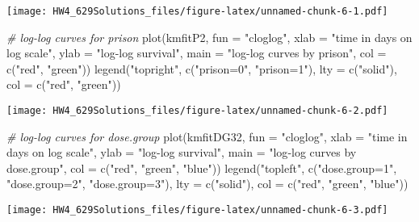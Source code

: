 \documentclass[
]{article}
\newenvironment{Shaded}{\begin{snugshade}}{\end{snugshade}}
\newcommand{\AttributeTok}[1]{\textcolor[rgb]{0.77,0.63,0.00}{#1}}
\newcommand{\CommentTok}[1]{\textcolor[rgb]{0.56,0.35,0.01}{\textit{#1}}}
\newcommand{\FunctionTok}[1]{\textcolor[rgb]{0.00,0.00,0.00}{#1}}
\newcommand{\NormalTok}[1]{#1}
\newcommand{\StringTok}[1]{\textcolor[rgb]{0.31,0.60,0.02}{#1}}
\begin{document}
\texttt{[image: HW4\_629Solutions\_files/figure-latex/unnamed-chunk-6-1.pdf]}

\begin{Shaded}
\begin{Highlighting}[]
\CommentTok{\# log{-}log curves for prison}
\FunctionTok{plot}\NormalTok{(kmfitP2, }\AttributeTok{fun =} \StringTok{"cloglog"}\NormalTok{, }\AttributeTok{xlab =} \StringTok{"time in days on log scale"}\NormalTok{, }\AttributeTok{ylab =} \StringTok{"log{-}log survival"}\NormalTok{,}
    \AttributeTok{main =} \StringTok{"log{-}log curves by prison"}\NormalTok{, }\AttributeTok{col =} \FunctionTok{c}\NormalTok{(}\StringTok{"red"}\NormalTok{, }\StringTok{"green"}\NormalTok{))}
\FunctionTok{legend}\NormalTok{(}\StringTok{"topright"}\NormalTok{, }\FunctionTok{c}\NormalTok{(}\StringTok{"prison=0"}\NormalTok{, }\StringTok{"prison=1"}\NormalTok{), }\AttributeTok{lty =} \FunctionTok{c}\NormalTok{(}\StringTok{"solid"}\NormalTok{), }\AttributeTok{col =} \FunctionTok{c}\NormalTok{(}\StringTok{"red"}\NormalTok{, }\StringTok{"green"}\NormalTok{))}
\end{Highlighting}
\end{Shaded}

\texttt{[image: HW4\_629Solutions\_files/figure-latex/unnamed-chunk-6-2.pdf]}

\begin{Shaded}
\begin{Highlighting}[]
\CommentTok{\# log{-}log curves for dose.group}
\FunctionTok{plot}\NormalTok{(kmfitDG32, }\AttributeTok{fun =} \StringTok{"cloglog"}\NormalTok{, }\AttributeTok{xlab =} \StringTok{"time in days on log scale"}\NormalTok{, }\AttributeTok{ylab =} \StringTok{"log{-}log survival"}\NormalTok{,}
    \AttributeTok{main =} \StringTok{"log{-}log curves by dose.group"}\NormalTok{, }\AttributeTok{col =} \FunctionTok{c}\NormalTok{(}\StringTok{"red"}\NormalTok{, }\StringTok{"green"}\NormalTok{, }\StringTok{"blue"}\NormalTok{))}
\FunctionTok{legend}\NormalTok{(}\StringTok{"topleft"}\NormalTok{, }\FunctionTok{c}\NormalTok{(}\StringTok{"dose.group=1"}\NormalTok{, }\StringTok{"dose.group=2"}\NormalTok{, }\StringTok{"dose.group=3"}\NormalTok{), }\AttributeTok{lty =} \FunctionTok{c}\NormalTok{(}\StringTok{"solid"}\NormalTok{),}
    \AttributeTok{col =} \FunctionTok{c}\NormalTok{(}\StringTok{"red"}\NormalTok{, }\StringTok{"green"}\NormalTok{, }\StringTok{"blue"}\NormalTok{))}
\end{Highlighting}
\end{Shaded}

\texttt{[image: HW4\_629Solutions\_files/figure-latex/unnamed-chunk-6-3.pdf]}
\end{document}
